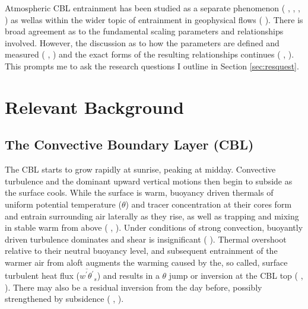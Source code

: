 Atmospheric \acs{CBL} entrainment has been studied as a separate phenomenon (\citeauthor{StullNelEl} \citeyear{StullNelEl}, \citeauthor{SullMoengStev} \citeyear{SullMoengStev}, \citeauthor{FedConzMir04} \citeyear{FedConzMir04}, \citeauthor{BrooksFowler2} \citeyear{BrooksFowler2}) as wellas within the wider topic of entrainment in geophysical flows (\citeauthor{Turner86} \citeyear{Turner86}). There is broad agreement as to the fundamental scaling parameters and relationships involved.  However, the discussion as to how the parameters are defined and measured (\citeauthor{BrooksFowler2} \citeyear{BrooksFowler2}, \citeauthor{Traum11} \citeyear{Traum11}) and the exact forms of the resulting relationships continues (\citeauthor{SullMoengStev} \citeyear{SullMoengStev}, \citeauthor{FedConzMir04} \citeyear{FedConzMir04} \citeauthor{BrooksFowler2} \citeyear{BrooksFowler2}).  This prompts me to ask the research questions I outline in Section \ref{sec:resquest}.


\section{Relevant Background}
\label{sec:}
\subsection{The Convective Boundary Layer (CBL)}

The \acs{CBL} starts to grow rapidly at sunrise, peaking at midday.  Convective turbulence and the dominant upward vertical motions then begin to subside as the surface cools.  While the surface is warm, buoyancy driven thermals of uniform potential temperature ($\theta$) and tracer concentration at their cores form and entrain surrounding air laterally as they rise, as well as trapping and mixing in stable warm from above (\citeauthor{Stull-BLMetIntro} \citeyear{Stull-BLMetIntro}, \citeauthor{CrumStullEl} \citeyear{CrumStullEl}).  Under conditions of strong convection, buoyantly driven turbulence dominates and shear is insignificant (\citeauthor{DirLEddy} \citeyear{DirLEddy}). Thermal overshoot relative to their neutral buoyancy level, and subsequent entrainment of the warmer air from aloft augments the warming caused by the, so called, surface turbulent heat flux ($\overline{w^{'}\theta^{'}}_{s}$) and results in a $\theta$ jump or inversion at the \acs{CBL} top (\citeauthor{SchmidtSchu} \citeyear{SchmidtSchu}, \citeauthor{Turner86} \citeyear{Turner86}).  There may also be a residual inversion from the day before, possibly strengthened by subsidence (\citeauthor{Stull-BLMetIntro} \citeyear{Stull-BLMetIntro}, \citeauthor{SullMoengStev} \citeyear{SullMoengStev}).\\  


